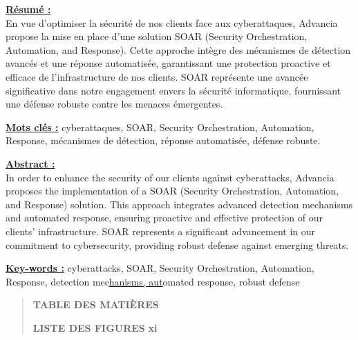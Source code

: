 \documentclass[
]{article}
\begin{document}
\textbf{\uline{Résumé :}}\\
En vue d'optimiser la sécurité de nos clients face aux cyberattaques,
Advancia propose la mise en place d'une solution SOAR (Security
Orchestration, Automation, and Response). Cette approche intègre des
mécanismes de détection avancés et une réponse automatisée, garantissant
une protection proactive et efficace de l'infrastructure de nos clients.
SOAR représente une avancée significative dans notre engagement envers
la sécurité informatique, fournissant une défense robuste contre les
menaces émergentes.

\textbf{\uline{Mots clés :}} cyberattaques, SOAR, Security
Orchestration, Automation, Response, mécanismes de détection, réponse
automatisée, défense robuste.

\textbf{\uline{Abstract :}}\\
In order to enhance the security of our clients against cyberattacks,
Advancia proposes the implementation of a SOAR (Security Orchestration,
Automation, and Response) solution. This approach integrates advanced
detection mechanisms and automated response, ensuring proactive and
effective protection of our clients' infrastructure. SOAR represents a
significant advancement in our commitment to cybersecurity, providing
robust defense against emerging threats.

\textbf{\uline{Key-words :}} cyberattacks, SOAR, Security Orchestration,
Automation, Response, detection mec\uline{hanisms, aut}omated response,
robust defense

\begin{quote}
\textbf{TABLE DES MATIÈRES}

\textbf{LISTE DES FIGURES} \textbf{xi}
\end{quote}
\end{document}
